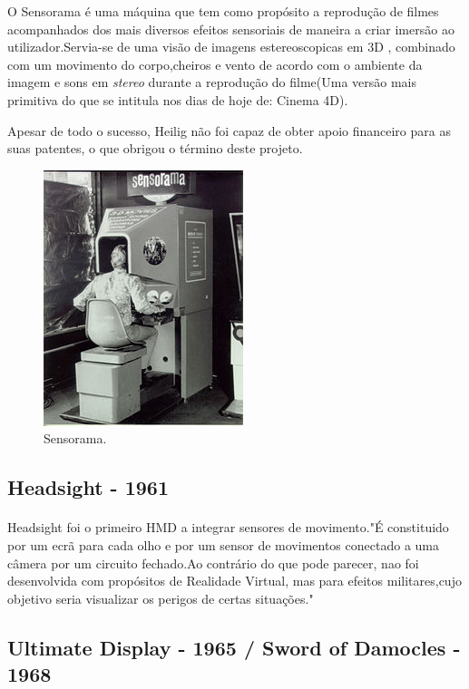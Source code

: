 O Sensorama é uma máquina que tem como propósito a reprodução de filmes acompanhados dos mais diversos efeitos sensoriais de maneira a criar imersão ao utilizador.Servia-se de uma visão de imagens estereoscopicas em 3D , combinado com um movimento do corpo,cheiros e vento de acordo com o ambiente da imagem e sons em \textit{stereo} durante a reprodução do filme(Uma versão mais primitiva do que se intitula nos dias de hoje de: Cinema 4D).

Apesar de todo o sucesso, Heilig não foi capaz de obter apoio financeiro para as suas patentes, o que obrigou o término deste projeto.
	\begin{figure}
	\center
	\includegraphics[scale=0.5]{imagens/Sensorama.jpg}
	\caption{Sensorama. \cite{5}}
	\end{figure}
	\subsection{Headsight - 1961}
	\paragraph{}
Headsight foi o primeiro HMD a integrar sensores de movimento."É constituido por um ecrã para cada olho e por um sensor de movimentos conectado a uma câmera por um circuito fechado.Ao contrário do que pode parecer, nao foi desenvolvida com propósitos de Realidade Virtual, mas para efeitos militares,cujo objetivo seria visualizar os perigos de certas situações."\cite{10}
	
	\subsection{Ultimate Display - 1965 / Sword of Damocles - 1968}
